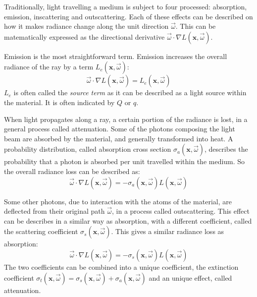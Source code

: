 Traditionally, light travelling a medium is subject to four processed: absorption, emission, inscattering and outscattering. Each of these effects can be described on how it makes radiance change along the unit direction $\vec{\omega}$. This can be matematically expressed as the directional derivative $\vec{\omega} \cdot \nabla L(\mathbf{x}, \vec{\omega})$. 

Emission is the most straightforward term. Emission increases the overall radiance of the ray by a term $L_e(\mathbf{x}, \vec{\omega})$:
$$\vec{\omega} \cdot \nabla L(\mathbf{x}, \vec{\omega}) = L_e(\mathbf{x}, \vec{\omega}) $$
$L_e$ is often called the \emph{source term} as it can be described as a light source within the material. It is often indicated by $Q$ or $q$. 

When light propagates along a ray, a certain portion of the radiance is lost, in a general process called attenuation. Some of the photons composing the light beam are absorbed by the material, and generally transformed into heat. A probability distribution, called absorption cross section $\sigma_a(\mathbf{x}, \vec{\omega})$, describes the probability that a photon is absorbed per unit travelled within the medium. So the overall radiance loss can be described as:
$$\vec{\omega} \cdot \nabla L(\mathbf{x}, \vec{\omega}) = - \sigma_a(\mathbf{x}, \vec{\omega}) L(\mathbf{x}, \vec{\omega}) $$

Some other photons, due to interaction with the atoms of the material, are deflected from their original path $\vec{\omega}$, in a process called outscattering. This effect can be describes in a similar way as absorption, with a different coefficient, called the scattering coefficient $\sigma_s(\mathbf{x}, \vec{\omega})$. This gives a similar radiance loss as absorption:
$$\vec{\omega} \cdot \nabla L(\mathbf{x}, \vec{\omega}) = - \sigma_s(\mathbf{x}, \vec{\omega}) L(\mathbf{x}, \vec{\omega}) $$
The two coefficients can be combined into a unique coefficient, the extinction coefficient $\sigma_t(\mathbf{x}, \vec{\omega}) =\sigma_s(\mathbf{x}, \vec{\omega}) + \sigma_a(\mathbf{x}, \vec{\omega})$ and an unique effect, called attenuation.

